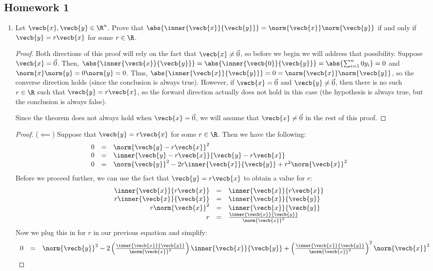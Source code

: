 \documentclass[a5paper]{article}
\theoremstyle{definition}%
\numberwithin{exercise}{section}
\theoremstyle{remark}%
\begin{document}
\subsection{Homework 1}
\begin{enumerate}
\item Let $\vecb{x}, \vecb{y} \in \R^n$. Prove that $\abs{\inner{\vecb{x}}{\vecb{y}}}=\norm{\vecb{x}}\norm{\vecb{y}}$ if and only if $\vecb{y}=r\vecb{x}$ for some $r\in\R$. 
\begin{proof}
Both directions of this proof will rely on the fact that $\vecb{x}\neq\vec{0}$, so before we begin we will address that possibility. Suppose $\vecb{x} =\vec{0}$. Then, $\abs{\inner{\vecb{x}}{\vecb{y}}} = \abs{\inner{\vecb{0}}{\vecb{y}}} = \abs{\sum_{i=1}^n 0y_i} = 0$ and $\norm{x}\norm{y} = 0\norm{y} = 0$. Thus, $\abs{\inner{\vecb{x}}{\vecb{y}}}=0=\norm{\vecb{x}}\norm{\vecb{y}}$, so the converse direction holds (since the conclusion is always true). However, if $\vecb{x}=\vec{0}$ and $\vecb{y}\neq\vec{0}$, then there is no such $r\in\R$ such that $\vecb{y}=r\vecb{x}$, so the forward direction actually does not hold in this case (the hypothesis is always true, but the conclusion is always false). 

Since the theorem does not always hold when $\vecb{x}=\vec{0}$, we will assume that $\vecb{x}\neq\vec{0}$ in the rest of this proof. 
\end{proof}

\begin{proof}($\impliedby$) Suppose that $\vecb{y}=r\vecb{x}$ for some $r\in\R$. Then we have the following:
\[\begin{array}{rcl}
0&=&\norm{\vecb{y}-r\vecb{x}}^2\\
0&=&\inner{\vecb{y}-r\vecb{x}}{\vecb{y}-r\vecb{x}}\\
0&=&\norm{\vecb{y}}^2-2r\inner{\vecb{x}}{\vecb{y}}+r^2\norm{\vecb{x}}^2\\
\end{array}\]
Before we proceed further, we can use the fact that $\vecb{y}=r\vecb{x}$ to obtain a value for $r$:
\[\begin{array}{rcl}
\inner{\vecb{x}}{r\vecb{x}}&=&\inner{\vecb{x}}{r\vecb{x}}\\
r\inner{\vecb{x}}{\vecb{x}}&=&\inner{\vecb{x}}{\vecb{y}}\\
r\norm{\vecb{x}}^2&=&\inner{\vecb{x}}{\vecb{y}}\\
r&=&\frac{\inner{\vecb{x}}{\vecb{y}}}{\norm{\vecb{x}}^2}\\
\end{array}\]
Now we plug this in for $r$ in our previous equation and simplify:
\[\begin{array}{rcl}
0&=&\norm{\vecb{y}}^2
-2\left(\frac{\inner{\vecb{x}}{\vecb{y}}}{\norm{\vecb{x}}^2}\right)\inner{\vecb{x}}{\vecb{y}}
+\left(\frac{\inner{\vecb{x}}{\vecb{y}}}{\norm{\vecb{x}}^2}\right)^2\norm{\vecb{x}}^2\\


\end{array}\]
\end{proof}
\end{enumerate}
\end{document}

